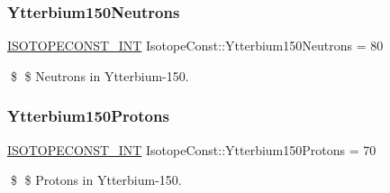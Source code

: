 \subsubsection{\texorpdfstring{Ytterbium150\+Neutrons}{Ytterbium150Neutrons}}
{\footnotesize\ttfamily \mbox{\hyperlink{group___isotope_const-_macros_ga5f18360b3e99483a35c32d789e62621c}{I\+S\+O\+T\+O\+P\+E\+C\+O\+N\+S\+T\+\_\+\+I\+NT}} Isotope\+Const\+::\+Ytterbium150\+Neutrons = 80}

\$ \$ Neutrons in Ytterbium-\/150. \mbox{\label{group___isotope_const-_ytterbium-_yb150_ga998dfc30c61f6394bbceb9853099d770}} 
\subsubsection{\texorpdfstring{Ytterbium150\+Protons}{Ytterbium150Protons}}
{\footnotesize\ttfamily \mbox{\hyperlink{group___isotope_const-_macros_ga5f18360b3e99483a35c32d789e62621c}{I\+S\+O\+T\+O\+P\+E\+C\+O\+N\+S\+T\+\_\+\+I\+NT}} Isotope\+Const\+::\+Ytterbium150\+Protons = 70}

\$ \$ Protons in Ytterbium-\/150. 